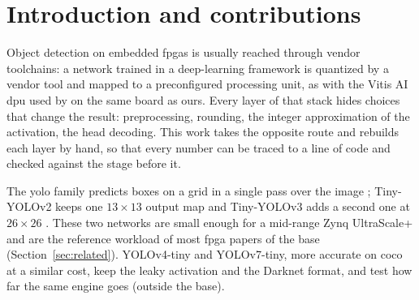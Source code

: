 \documentclass[11pt,a4paper]{article}
\begin{document}
\section{Introduction and contributions}

Object detection on embedded \glspl{fpga} is usually reached through vendor toolchains: a network
trained in a deep-learning framework is quantized by a vendor tool and mapped to a
preconfigured processing unit, as with the Vitis AI \gls{dpu} used by \citet{2026-fata} on the
same board as ours. Every layer of that stack hides choices that change the result:
preprocessing, rounding, the integer approximation of the activation, the head decoding.
This work takes the opposite route and rebuilds each layer by hand, so that every number
can be traced to a line of code and checked against the stage before it.

The \gls{yolo} family predicts boxes on a grid in a single pass over the image
\cite[\#002.0]{1506.02640}; Tiny-YOLOv2 keeps one $13\times13$ output map
\cite[\#002.2]{1612.08242} and Tiny-YOLOv3 adds a second one at $26\times26$
\cite[\#004.1]{2023-zhai}. These two networks are small enough for a mid-range Zynq
UltraScale+ and are the reference workload of most \gls{fpga} papers of the \gls{base}
(Section~\ref{sec:related}). YOLOv4-tiny and YOLOv7-tiny, more accurate on \gls{coco} at a
similar cost, keep the leaky activation and the Darknet format, and test how far the same
engine goes (outside the \gls{base}).
\end{document}
